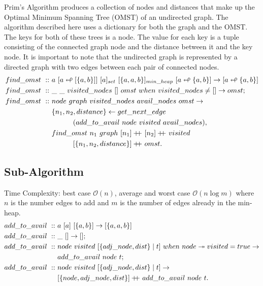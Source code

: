 \documentclass[a4paper,10pt]{book}
\newcommand\when{\  when\ }
\newcommand\doubleplus{+\kern-1.3ex+\kern0.8ex}
\begin{document}
Prim's Algorithm produces a collection of nodes and distances that make up the Optimal Minimum Spanning Tree (OMST) of an undirected graph. The algorithm described here uses a dictionary for both the graph and the OMST. The keys for both of these trees is a node. The value for each key is a tuple consisting of the connected graph node and the distance between it and the key node. It is important to note that the undirected graph is represented by a directed graph with two edges between each pair of connected nodes.
\begin{align*}
find\_omst\ ::\ &a\ [a\looparrowleft [\{a,b\}]]\ [a]_{set}\ [\{a,a,b\}]_{min\_heap}\ [a\looparrowleft \{a,b\}]\rightarrow [a\looparrowleft \{a,b\}]\\
find\_omst\ ::\ &\_\ \_\ visited\_nodes\ []\ omst\when visited\_nodes\ne []\rightarrow omst;\\
find\_omst\ ::\ &node\ graph\ visited\_nodes\ avail\_nodes\ omst\rightarrow\\
	&\{n_1,n_2,distance\}\leftarrow get\_next\_edge\\
	&\qquad\quad(add\_to\_avail\ node\ visited\ avail\_nodes),\\
	&find\_omst\ n_1\ graph\ [n_1]\doubleplus[n_2]\doubleplus visited\\
	&\qquad\quad[\{n_1,n_2,distance\}]\doubleplus omst.
\end{align*}
\subsection{Sub-Algorithm}
Time Complexity: best case $\mathcal{O}(n)$, average and worst case $\mathcal{O}(n\log m)$ where $n$ is the number edges to add and $m$ is the number of edges already in the min-heap. 
\begin{align*}
add\_to\_avail\ ::\ &a\ [a]\ [\{a,b\}]\rightarrow[\{a,a,b\}]\\
add\_to\_avail\ ::\ &\_\ []\rightarrow[];\\
add\_to\_avail\ ::\ &node\ visited\ [\{adj\_node,dist\}\mid t]\when node\twoheadrightarrow visited = true\rightarrow\\
	&add\_to\_avail\ node\ t;\\
add\_to\_avail\ ::\ &node\ visited\ [\{adj\_node,dist\}\mid t]\rightarrow\\
	&[\{node,adj\_node,dist\}]\doubleplus add\_to\_avail\ node\ t.
\end{align*}
\end{document}

